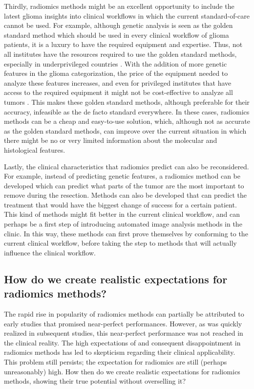 Thirdly, radiomics methods might be an excellent opportunity to include  the latest glioma insights into clinical workflows in which the current standard-of-care cannot be used.
For example, although genetic analysis is seen as the golden standard method which should be used in every clinical workflow of glioma patients, it is a luxury to have the required equipment and expertise.
Thus, not all institutes have the resources required to use the golden standard methods, especially in underprivileged countries \autocite{santosh2019india}.
With the addition of more genetic features in the glioma categorization, the price of the equipment needed to analyze these features  increases, and even for privileged institutes that have access to the required equipment it might not be cost-effective to analyze all \glspl{tumor} \autocite{malzkorn2016practical,dewitt2017costIDH}.
This makes these golden standard methods, although preferable for their accuracy, infeasible as the de facto standard everywhere.
In these cases, radiomics methods can be a cheap and easy-to-use solution, which, although not as accurate as the golden standard methods, can improve over the current situation in which there might be no or very limited information about the molecular and histological features.

Lastly, the clinical characteristics that radiomics predict can also be reconsidered.
For example, instead of predicting genetic features, a radiomics method can be developed which can predict what parts of the \gls{tumor} are the most important to remove during the resection.
Methods can also be developed that can predict the treatment that would have the biggest change of success for a certain patient.
This kind of methods might fit better in the current clinical workflow, and can perhaps be a first step of introducing automated image analysis methods in the clinic.
In this way, these methods can first prove themselves by conforming to the current clinical workflow, before taking the step to methods that will actually influence the clinical workflow.

\subsection{How do we create realistic expectations for radiomics methods?}

The rapid rise in popularity of radiomics methods can partially be attributed to early studies that promised near-perfect performances.
However, as was quickly realized in subsequent studies, this near-perfect performance was not reached in the clinical reality.
The high expectations of and consequent disappointment in  radiomics methods has led to skepticism regarding their clinical applicability.
This problem still persists; the expectation for radiomics are still (perhaps unreasonably) high.
How then do we create realistic expectations for radiomics methods, showing their true potential without overselling it?

